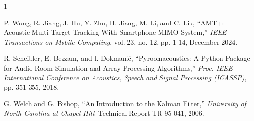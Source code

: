 \documentclass[a4paper]{article}
\begin{document}

\begin{thebibliography}{1}

P. Wang, R. Jiang, J. Hu, Y. Zhu, H. Jiang, M. Li, and C. Liu,
``AMT+: Acoustic Multi-Target Tracking With Smartphone MIMO System,''
{\em IEEE Transactions on Mobile Computing}, vol. 23, no. 12, pp. 1-14, December 2024.

R. Scheibler, E. Bezzam, and I. Dokmanić,
``Pyroomacoustics: A Python Package for Audio Room Simulation and Array Processing Algorithms,''
{\em Proc. IEEE International Conference on Acoustics, Speech and Signal Processing (ICASSP)}, pp. 351-355, 2018.

G. Welch and G. Bishop,
``An Introduction to the Kalman Filter,''
{\em University of North Carolina at Chapel Hill}, Technical Report TR 95-041, 2006.

\end{thebibliography}
\end{document}
